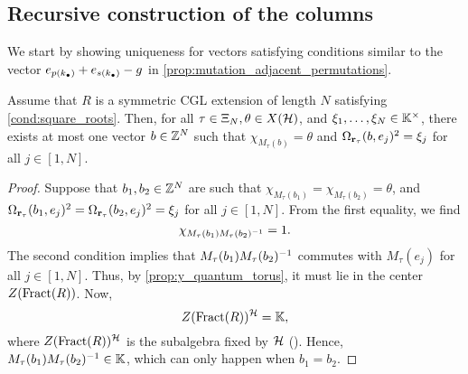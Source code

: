 \subsection{Recursive construction of the columns}

We start by showing uniqueness for vectors satisfying conditions similar to the vector
$e_{p(k_\bullet)} + e_{s(k_\bullet)} - g$ in \cref{prop:mutation_adjacent_permutations}.

\begin{lemma}\label{lem:unique_b}
	Assume that $R$ is a symmetric CGL extension of length $N$ satisfying \cref{cond:square_roots}. Then, for all $\tau \in \Xi_N, \theta \in X(\mathcal{H})$, and $\xi_1, \dots, \xi_N \in \mathbb{K}^\times$, there exists at most one vector $b\in \mathbb{Z}^N$ such that $\chi_{M_\tau(b)} = \theta$ and $\Omega_{\mathbf{r}_\tau}(b, e_j)^2 = \xi_j$ for all $j \in [1, N]$.
\end{lemma}
\begin{proof}
	Suppose that $b_1, b_2 \in \mathbb{Z}^N$ are such that $\chi_{M_\tau(b_1)} = \chi_{M_\tau(b_2)} = \theta$, and $\Omega_{\mathbf{r}_\tau}(b_1, e_j)^2 = \Omega_{\mathbf{r}_\tau}(b_2, e_j)^2 = \xi_j$ for all $j \in [1, N]$. From the first equality, we find
	\begin{equation*}
		\chi_{M_\tau(b_1)M_\tau(b_2)^{-1}} = 1.
	\end{equation*}
	The second condition implies that $M_\tau(b_1)M_\tau(b_2)^{-1}$ commutes with
	$M_\tau(e_j)$ for all $j\in [1, N]$. Thus, by \cref{prop:y_quantum_torus}, it must lie
	in the center $Z(\operatorname{Fract}(R))$. Now,
	\begin{equation*}
		Z(\operatorname{Fract}(R))^{\mathcal{H}} = \mathbb{K},
	\end{equation*}
	where $Z(\operatorname{Fract}(R))^{\mathcal{H}}$ is the subalgebra fixed by $\mathcal{H}$ (\cite[Theorem II.6.4]{GoodearlBrown2002LecturesAQC}). Hence, $M_\tau(b_1)M_\tau(b_2)^{-1} \in \mathbb{K}$, which can only happen when $b_1 = b_2$.
\end{proof}

